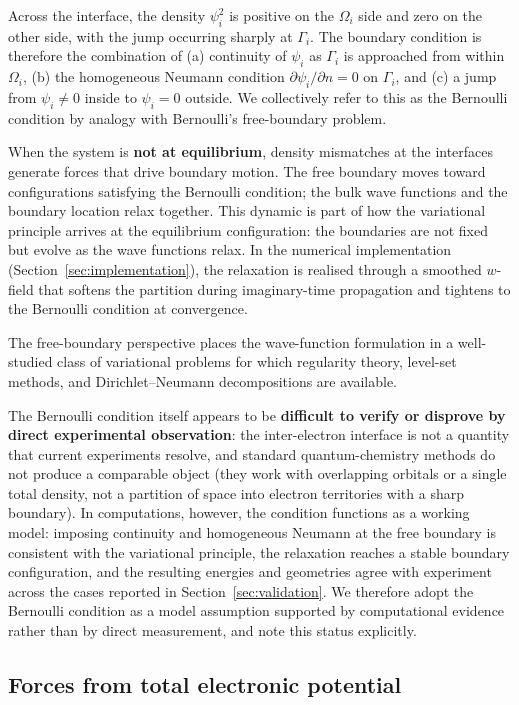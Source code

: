 \documentclass[11pt]{article}
\begin{document}
Across the interface, the density $\psi_i^2$ is positive on the $\Omega_i$ side and zero on the other side, with the jump occurring sharply at $\Gamma_i$. The boundary condition is therefore the combination of (a) continuity of $\psi_i$ as $\Gamma_i$ is approached from within $\Omega_i$, (b) the homogeneous Neumann condition $\partial \psi_i / \partial n = 0$ on $\Gamma_i$, and (c) a jump from $\psi_i \ne 0$ inside to $\psi_i = 0$ outside. We collectively refer to this as the Bernoulli condition by analogy with Bernoulli's free-boundary problem.

When the system is \textbf{not at equilibrium}, density mismatches at the interfaces generate forces that drive boundary motion. The free boundary moves toward configurations satisfying the Bernoulli condition; the bulk wave functions and the boundary location relax together. This dynamic is part of how the variational principle arrives at the equilibrium configuration: the boundaries are not fixed but evolve as the wave functions relax. In the numerical implementation (Section~\ref{sec:implementation}), the relaxation is realised through a smoothed $w$-field that softens the partition during imaginary-time propagation and tightens to the Bernoulli condition at convergence.

The free-boundary perspective places the wave-function formulation in a well-studied class of variational problems for which regularity theory, level-set methods, and Dirichlet--Neumann decompositions are available.

The Bernoulli condition itself appears to be \textbf{difficult to verify or disprove by direct experimental observation}: the inter-electron interface is not a quantity that current experiments resolve, and standard quantum-chemistry methods do not produce a comparable object (they work with overlapping orbitals or a single total density, not a partition of space into electron territories with a sharp boundary). In computations, however, the condition functions as a working model: imposing continuity and homogeneous Neumann at the free boundary is consistent with the variational principle, the relaxation reaches a stable boundary configuration, and the resulting energies and geometries agree with experiment across the cases reported in Section~\ref{sec:validation}. We therefore adopt the Bernoulli condition as a model assumption supported by computational evidence rather than by direct measurement, and note this status explicitly.

\subsection{Forces from total electronic potential}\label{sec:forces}
\end{document}

